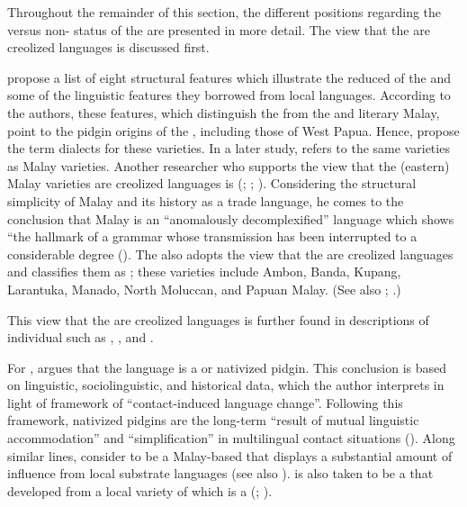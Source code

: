 Throughout the remainder of this section, the different positions regarding the  versus non- status of the  are presented in more detail. The view that the  are creolized languages is discussed first.

\citet[675]{Adelaar.1996} propose a list of eight structural features which illustrate the reduced  of the  and some of the linguistic features they borrowed from local languages. According to the authors, these features, which distinguish the  from the  and literary Malay, point to the pidgin origins of the , including those of West Papua. Hence, \citet{Adelaar.1996} propose the term  dialects for these varieties. In a later study, {\citet[202]{Adelaar.2005d}} refers to the same varieties as  Malay varieties. Another researcher who supports the view that the (eastern) Malay varieties are creolized languages is \citeauthor{McWhorter.2001} (\citeyear*{McWhorter.2001}; \citeyear*{ McWhorter.2005}; \citeyear*[197–251]{McWhorter.2007}). Considering the structural simplicity of Malay and its history as a trade language, he comes to the conclusion that Malay is an  ``anomalously decomplexified'' language which shows  ``the hallmark of a grammar whose transmission has been interrupted to a considerable degree (\citeyear*[197, 216]{McWhorter.2007}). The  \citep{Lewis.2016} also adopts the view that the  are creolized languages and classifies them as ; these varieties include Ambon, Banda, Kupang, Larantuka, Manado, North Moluccan, and Papuan Malay. (See also \citealt{Roosman.1982}; \citealt{Burung.2007}.)

This view that the  are creolized languages is further found in descriptions of individual  such as , , and .

For , {\citet[115]{Grimes.1991}} argues that the language is a  or nativized pidgin. This conclusion is based on linguistic, sociolinguistic, and historical data, which the author interprets in light of  framework of  ``contact-induced language change''. Following this framework, nativized pidgins are the long-term  ``result of mutual linguistic accommodation'' and  ``simplification'' in multilingual contact situations (\citeyear*[174, 205, 227]{Thomason.1988}). Along similar lines, {\citet[337]{Jacob.2011}} consider  to be a Malay-based  that displays a substantial amount of influence from local substrate languages (see also \citealt{Jacob.2006}).  is also taken to be a  that developed from a local variety of  which is a  (\citealt[411]{Prentice.1994}; \citealt[8]{Stoel.2005}).




